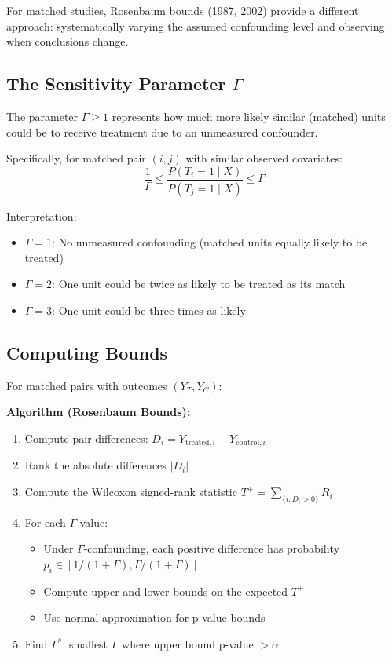 For matched studies, Rosenbaum bounds (1987, 2002) provide a different approach: systematically varying the assumed confounding level and observing when conclusions change.

\subsection{The Sensitivity Parameter $\Gamma$}

\begin{definition}
\label{def:gamma}
The parameter $\Gamma \geq 1$ represents how much more likely similar (matched) units could be to receive treatment due to an unmeasured confounder.
\end{definition}

Specifically, for matched pair $(i, j)$ with similar observed covariates:
\begin{equation}
\frac{1}{\Gamma} \leq \frac{P(T_i = 1 \mid X)}{P(T_j = 1 \mid X)} \leq \Gamma
\end{equation}

Interpretation:
\begin{itemize}
    \item $\Gamma = 1$: No unmeasured confounding (matched units equally likely to be treated)
    \item $\Gamma = 2$: One unit could be twice as likely to be treated as its match
    \item $\Gamma = 3$: One unit could be three times as likely
\end{itemize}

\subsection{Computing Bounds}

For matched pairs with outcomes $(Y_T, Y_C)$:

\textbf{Algorithm (Rosenbaum Bounds):}
\begin{enumerate}
    \item Compute pair differences: $D_i = Y_{\text{treated},i} - Y_{\text{control},i}$
    \item Rank the absolute differences $|D_i|$
    \item Compute the Wilcoxon signed-rank statistic $T^+ = \sum_{\{i: D_i > 0\}} R_i$
    \item For each $\Gamma$ value:
    \begin{itemize}
        \item Under $\Gamma$-confounding, each positive difference has probability $p_i \in [1/(1+\Gamma), \Gamma/(1+\Gamma)]$
        \item Compute upper and lower bounds on the expected $T^+$
        \item Use normal approximation for p-value bounds
    \end{itemize}
    \item Find $\Gamma^*$: smallest $\Gamma$ where upper bound p-value $> \alpha$
\end{enumerate}


